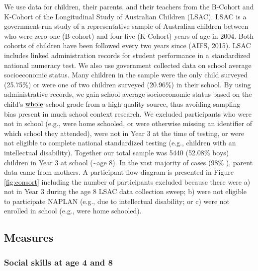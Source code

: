 \documentclass[
  english,
  man]{apa6}
\begin{document}
We use data for children, their parents, and their teachers from the B-Cohort and K-Cohort of the Longitudinal Study of Australian Children (LSAC). LSAC is a government-run study of a representative sample of Australian children between who were zero-one (B-cohort) and four-five (K-Cohort) years of age in 2004. Both cohorts of children have been followed every two years since (AIFS, 2015). LSAC includes linked administration records for student performance in a standardized national numeracy test. We also use government collected data on school average socioeconomic status. Many children in the sample were the only child surveyed (25.75\%) or were one of two children surveyed (20.96\%) in their school. By using administrative records, we gain school average socioeconomic status based on the child's \(\text{\underline{whole}}\) school grade from a high-quality source, thus avoiding sampling bias present in much school context research. We excluded participants who were not in school (e.g., were home schooled, or were otherwise missing an identifier of which school they attended), were not in Year 3 at the time of testing, or were not eligible to complete national standardized testing (e.g., children with an intellectual disability). Together our total sample was 5440 (52.08\% boys) children in Year 3 at school (\textasciitilde age 8). In the vast majority of cases (98\% ), parent data came from mothers. A participant flow diagram is presented in Figure \ref{fig:consort} including the number of participants excluded because there were a) not in Year 3 during the age 8 LSAC data collection sweep; b) were not eligible to participate NAPLAN (e.g., due to intellectual disability; or c) were not enrolled in school (e.g., were home schooled).

\hypertarget{measures}{%
\subsection{Measures}\label{measures}}

\hypertarget{social-skills-at-age-4-and-8}{%
\subsubsection{Social skills at age 4 and 8}\label{social-skills-at-age-4-and-8}}
\end{document}
